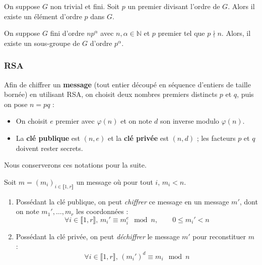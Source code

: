   \begin{application}
    On suppose $G$ non trivial et fini. Soit $p$ un premier divisant l'ordre de $G$. Alors il existe un élément d'ordre $p$ dans $G$.
  \end{application}


  \begin{application}
    On suppose $G$ fini d'ordre $n p^\alpha$ avec $n, \alpha \in \mathbb{N}$ et $p$ premier tel que $p \nmid n$. Alors, il existe un sous-groupe de $G$ d’ordre $p^\alpha$.
  \end{application}

  \subsubsection{RSA}


  \begin{definition}
    Afin de chiffrer un \textbf{message} (tout entier découpé en séquence d'entiers de taille bornée) en utilisant RSA, on choisit deux nombres premiers distincts $p$ et $q$, puis on pose $n=pq$ :
    \begin{itemize}
      \item On choisit $e$ premier avec $\varphi(n)$ et on note $d$ son inverse modulo $\varphi(n)$.
      \item La \textbf{clé publique} est $(n,e)$ et la \textbf{clé privée} est $(n,d)$ ; les facteurs $p$ et $q$ doivent rester secrets.
    \end{itemize}
  \end{definition}

  Nous conserverons ces notations pour la suite.

  \begin{theorem}
    Soit $m = (m_i)_{i \in \llbracket 1, r \rrbracket}$ un message où pour tout $i$, $m_i < n$.
    \begin{enumerate}[label={\bfseries(\roman*)}]
      \item Possédant la clé publique, on peut \textit{chiffrer} ce message en un message $m'$, dont on note $m_1', \dots, m_r$ les coordonnées :
      \[ \forall i \in \llbracket 1,r \rrbracket, \, m_i' \equiv m_i^e \mod n, \qquad 0 \leq m_i' < n \]
      \item Possédant la clé privée, on peut \textit{déchiffrer} le message $m'$ pour reconstituer $m$ :
      \[ \forall i \in \llbracket 1,r \rrbracket, \, (m_i')^d \equiv m_i \mod n \]
    \end{enumerate}
  \end{theorem}

